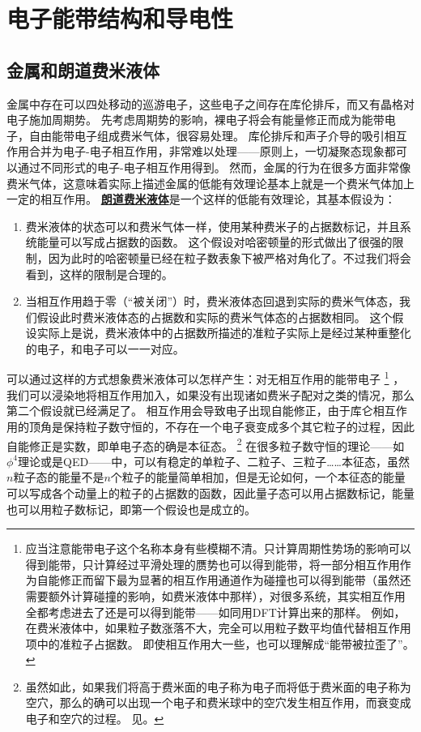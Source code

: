 \documentclass[hyperref, UTF8, a4paper]{ctexart}
\renewcommand{\autoref}{\prettyref}
\newcommand*{\concept}[1]{\underline{\textbf{#1}}}
\begin{document}

\section{电子能带结构和导电性}

\subsection{金属和朗道费米液体}

金属中存在可以四处移动的巡游电子，这些电子之间存在库伦排斥，而又有晶格对电子施加周期势。
先考虑周期势的影响，裸电子将会有能量修正而成为能带电子，自由能带电子组成费米气体，很容易处理。
库伦排斥和声子介导的吸引相互作用合并为电子-电子相互作用，非常难以处理——原则上，一切凝聚态现象都可以通过不同形式的电子-电子相互作用得到。
然而，金属的行为在很多方面非常像费米气体，这意味着实际上描述金属的低能有效理论基本上就是一个费米气体加上一定的相互作用。
\concept{朗道费米液体}是一个这样的低能有效理论，其基本假设为：
\begin{enumerate}
    \item 费米液体的状态可以和费米气体一样，使用某种费米子的占据数标记，并且系统能量可以写成占据数的函数。
    这个假设对哈密顿量的形式做出了很强的限制，因为此时的哈密顿量已经在粒子数表象下被严格对角化了。不过我们将会看到，这样的限制是合理的。
    \item 当相互作用趋于零（“被关闭”）时，费米液体态回退到实际的费米气体态，我们假设此时费米液体态的占据数和实际的费米气体态的占据数相同。
    这个假设实际上是说，费米液体中的占据数所描述的准粒子实际上是经过某种重整化的电子，和电子可以一一对应。
\end{enumerate}

可以通过这样的方式想象费米液体可以怎样产生：对无相互作用的能带电子%
\footnote{
    应当注意能带电子这个名称本身有些模糊不清。只计算周期性势场的影响可以得到能带，只计算经过平滑处理的赝势也可以得到能带，将一部分相互作用作为自能修正而留下最为显著的相互作用通道作为碰撞也可以得到能带（虽然还需要额外计算碰撞的影响，如费米液体中那样），对很多系统，其实相互作用全都考虑进去了还是可以得到能带——如同用DFT计算出来的那样。
    例如，在费米液体中，如果粒子数涨落不大，完全可以用粒子数平均值代替相互作用项中的准粒子占据数。
    即使相互作用大一些，也可以理解成“能带被拉歪了”。
}%
，我们可以浸染地将相互作用加入，如果没有出现诸如费米子配对之类的情况，那么第二个假设就已经满足了。
相互作用会导致电子出现自能修正，由于库仑相互作用的顶角是保持粒子数守恒的，不存在一个电子衰变成多个其它粒子的过程，因此自能修正是实数，即单电子态的确是本征态。%
\footnote{
    虽然如此，如果我们将高于费米面的电子称为电子而将低于费米面的电子称为空穴，那么的确可以出现一个电子和费米球中的空穴发生相互作用，而衰变成电子和空穴的过程。
    见\autoref{sec:fermi-liquid-ground}。
}%
在很多粒子数守恒的理论——如$\phi^4$理论或是QED——中，可以有稳定的单粒子、二粒子、三粒子……本征态，虽然$n$粒子态的能量不是$n$个粒子的能量简单相加，但是无论如何，一个本征态的能量可以写成各个动量上的粒子的占据数的函数，因此量子态可以用占据数标记，能量也可以用粒子数标记，即第一个假设也是成立的。
\end{document}
